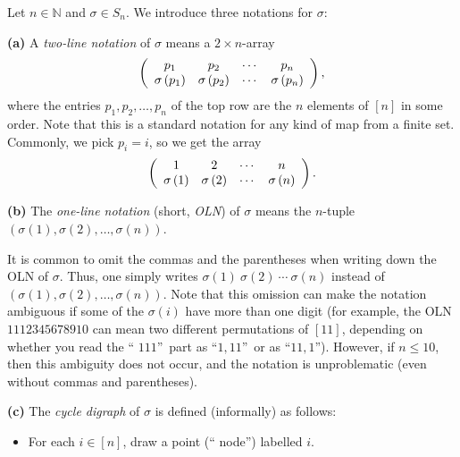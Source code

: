 \begin{definition}
\label{def.perm.notations}Let $n\in\mathbb{N}$ and $\sigma\in S_{n}$. We
introduce three notations for $\sigma$: \medskip

\textbf{(a)} A \emph{two-line notation} of $\sigma$ means a $2\times n$-array
\[
\left(
\begin{array}
[c]{cccc}%
p_{1} & p_{2} & \cdots & p_{n}\\
\sigma\left(  p_{1}\right)  & \sigma\left(  p_{2}\right)  & \cdots &
\sigma\left(  p_{n}\right)
\end{array}
\right)  ,
\]
where the entries $p_{1},p_{2},\ldots,p_{n}$ of the top row are the $n$
elements of $\left[  n\right]  $ in some order. Note that this is a standard
notation for any kind of map from a finite set. Commonly, we pick $p_{i}=i$,
so we get the array
\[
\left(
\begin{array}
[c]{cccc}%
1 & 2 & \cdots & n\\
\sigma\left(  1\right)  & \sigma\left(  2\right)  & \cdots & \sigma\left(
n\right)
\end{array}
\right)  .
\]


\textbf{(b)} The \emph{one-line notation} (short, \emph{OLN}) of $\sigma$
means the $n$-tuple $\left(  \sigma\left(  1\right)  ,\sigma\left(  2\right)
,\ldots,\sigma\left(  n\right)  \right)  $.

It is common to omit the commas and the parentheses when writing down the OLN
of $\sigma$. Thus, one simply writes $\sigma\left(  1\right)  \ \sigma\left(
2\right)  \ \cdots\ \sigma\left(  n\right)  $ instead of $\left(
\sigma\left(  1\right)  ,\sigma\left(  2\right)  ,\ldots,\sigma\left(
n\right)  \right)  $. Note that this omission can make the notation ambiguous
if some of the $\sigma\left(  i\right)  $ have more than one digit (for
example, the OLN $1112345678910$ can mean two different permutations of
$\left[  11\right]  $, depending on whether you read the \textquotedblleft%
$111$\textquotedblright\ part as \textquotedblleft$1,11$\textquotedblright\ or
as \textquotedblleft$11,1$\textquotedblright). However, if $n\leq10$, then
this ambiguity does not occur, and the notation is unproblematic (even without
commas and parentheses). \medskip

\textbf{(c)} The \emph{cycle digraph} of $\sigma$ is defined (informally) as follows:

\begin{itemize}
\item For each $i\in\left[  n\right]  $, draw a point (\textquotedblleft
node\textquotedblright) labelled $i$.


\end{itemize}
\end{definition}
